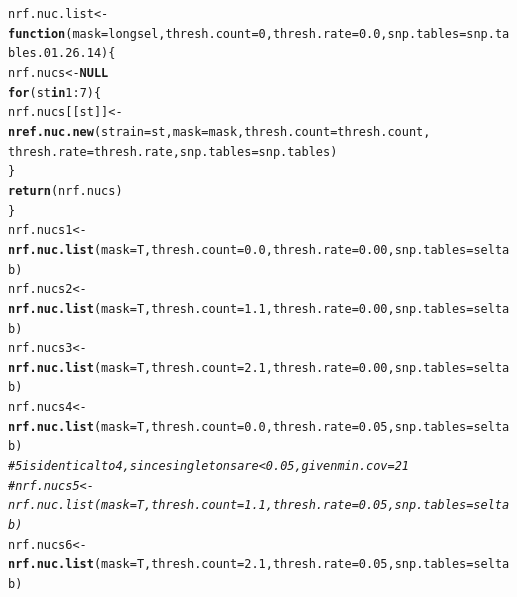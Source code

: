 \documentclass{article}\usepackage[]{graphicx}\usepackage[]{color}
\makeatletter
\newcommand{\hlnum}[1]{\textcolor[rgb]{0.686,0.059,0.569}{#1}}%
\newcommand{\hlcom}[1]{\textcolor[rgb]{0.678,0.584,0.686}{\textit{#1}}}%
\newcommand{\hlopt}[1]{\textcolor[rgb]{0,0,0}{#1}}%
\newcommand{\hlstd}[1]{\textcolor[rgb]{0.345,0.345,0.345}{#1}}%
\newcommand{\hlkwa}[1]{\textcolor[rgb]{0.161,0.373,0.58}{\textbf{#1}}}%
\newcommand{\hlkwb}[1]{\textcolor[rgb]{0.69,0.353,0.396}{#1}}%
\newcommand{\hlkwc}[1]{\textcolor[rgb]{0.333,0.667,0.333}{#1}}%
\newcommand{\hlkwd}[1]{\textcolor[rgb]{0.737,0.353,0.396}{\textbf{#1}}}%
\newenvironment{kframe}{%
 \def\at@end@of@kframe{}%
 \ifinner\ifhmode%
  \def\at@end@of@kframe{\end{minipage}}%
  \begin{minipage}{\columnwidth}%
 \fi\fi%
 \def\FrameCommand##1{\hskip\@totalleftmargin \hskip-\fboxsep
 \colorbox{shadecolor}{##1}\hskip-\fboxsep
     \hskip-\linewidth \hskip-\@totalleftmargin \hskip\columnwidth}%
 \MakeFramed {\advance\hsize-\width
   \@totalleftmargin\z@ \linewidth\hsize
   \@setminipage}}%
 {\par\unskip\endMakeFramed%
 \at@end@of@kframe}
\newenvironment{knitrout}{}{} %
\makeatother
\begin{document}
\begin{knitrout}\footnotesize
{}\color{fgcolor}\begin{kframe}
\begin{alltt}
\hlstd{nrf.nuc.list} \hlkwb{<-} \hlkwa{function}\hlstd{(}\hlkwc{mask}\hlstd{=longsel,} \hlkwc{thresh.count}\hlstd{=}\hlnum{0}\hlstd{,} \hlkwc{thresh.rate}\hlstd{=}\hlnum{0.0}\hlstd{,} \hlkwc{snp.tables}\hlstd{=snp.tables.01.26.14)\{}
  \hlstd{nrf.nucs} \hlkwb{<-} \hlkwa{NULL}
  \hlkwa{for}\hlstd{(st} \hlkwa{in} \hlnum{1}\hlopt{:}\hlnum{7}\hlstd{)\{}
    \hlstd{nrf.nucs[[st]]} \hlkwb{<-} \hlkwd{nref.nuc.new}\hlstd{(}\hlkwc{strain}\hlstd{=st,} \hlkwc{mask}\hlstd{=mask,} \hlkwc{thresh.count}\hlstd{=thresh.count,}
                                   \hlkwc{thresh.rate}\hlstd{=thresh.rate,} \hlkwc{snp.tables}\hlstd{=snp.tables)}
  \hlstd{\}}
  \hlkwd{return}\hlstd{(nrf.nucs)}
\hlstd{\}}
\hlstd{nrf.nucs1} \hlkwb{<-} \hlkwd{nrf.nuc.list}\hlstd{(}\hlkwc{mask}\hlstd{=T,} \hlkwc{thresh.count}\hlstd{=}\hlnum{0.0}\hlstd{,} \hlkwc{thresh.rate}\hlstd{=}\hlnum{0.00}\hlstd{,} \hlkwc{snp.tables}\hlstd{=seltab)}
\hlstd{nrf.nucs2} \hlkwb{<-} \hlkwd{nrf.nuc.list}\hlstd{(}\hlkwc{mask}\hlstd{=T,} \hlkwc{thresh.count}\hlstd{=}\hlnum{1.1}\hlstd{,} \hlkwc{thresh.rate}\hlstd{=}\hlnum{0.00}\hlstd{,} \hlkwc{snp.tables}\hlstd{=seltab)}
\hlstd{nrf.nucs3} \hlkwb{<-} \hlkwd{nrf.nuc.list}\hlstd{(}\hlkwc{mask}\hlstd{=T,} \hlkwc{thresh.count}\hlstd{=}\hlnum{2.1}\hlstd{,} \hlkwc{thresh.rate}\hlstd{=}\hlnum{0.00}\hlstd{,} \hlkwc{snp.tables}\hlstd{=seltab)}
\hlstd{nrf.nucs4} \hlkwb{<-} \hlkwd{nrf.nuc.list}\hlstd{(}\hlkwc{mask}\hlstd{=T,} \hlkwc{thresh.count}\hlstd{=}\hlnum{0.0}\hlstd{,} \hlkwc{thresh.rate}\hlstd{=}\hlnum{0.05}\hlstd{,} \hlkwc{snp.tables}\hlstd{=seltab)}
\hlcom{# 5 is identical to 4, since singletons are < 0.05, given min.cov=21}
\hlcom{# nrf.nucs5 <- nrf.nuc.list(mask=T, thresh.count=1.1, thresh.rate=0.05, snp.tables=seltab)}
\hlstd{nrf.nucs6} \hlkwb{<-} \hlkwd{nrf.nuc.list}\hlstd{(}\hlkwc{mask}\hlstd{=T,} \hlkwc{thresh.count}\hlstd{=}\hlnum{2.1}\hlstd{,} \hlkwc{thresh.rate}\hlstd{=}\hlnum{0.05}\hlstd{,} \hlkwc{snp.tables}\hlstd{=seltab)}


\end{alltt}
\end{kframe}
\end{knitrout}
\end{document}
